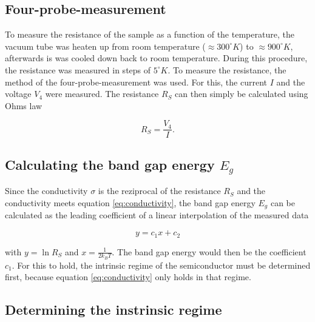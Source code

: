 \documentclass[a4paper]{article}
\begin{document}
\subsection{Four-probe-measurement}

To measure the resistance of the sample as a function of the temperature, the vacuum tube was heaten up from room temperature ($\approx 300 ^{\circ}K$) to $\approx 900 ^{\circ}K$, afterwards is was cooled down back to room temperature. During this procedure, the resistance was measured in steps of $5 ^{\circ}K$. To measure the resistance, the method of the four-probe-measurement was used.
\newline
For this, the current $I$ and the voltage $V_4$ were measured. The resistance $R_S$ can then simply be calculated using Ohms law

\begin{equation}
R_S = \frac{V_4}{I}.
\end{equation}

\subsection{Calculating the band gap energy $E_g$}

Since the conductivity $\sigma$ is the reziprocal of the resistance $R_S$ and the conductivity meets equation \eqref{eq:conductivity}, the band gap energy $E_g$ can be calculated as the leading coefficient of a linear interpolation of the measured data

\begin{equation}
y = c_1 x + c_2
\end{equation}

with $y = \ln{R_S}$ and $x = \frac{1}{2 k_B T}$. The band gap energy would then be the coefficient $c_1$. For this to hold, the intrinsic regime of the semiconductor must be determined first, because equation \eqref{eq:conductivity} only holds in that regime.

\subsection{Determining the instrinsic regime}
\label{sec:intrinsicRegime}
\end{document}
